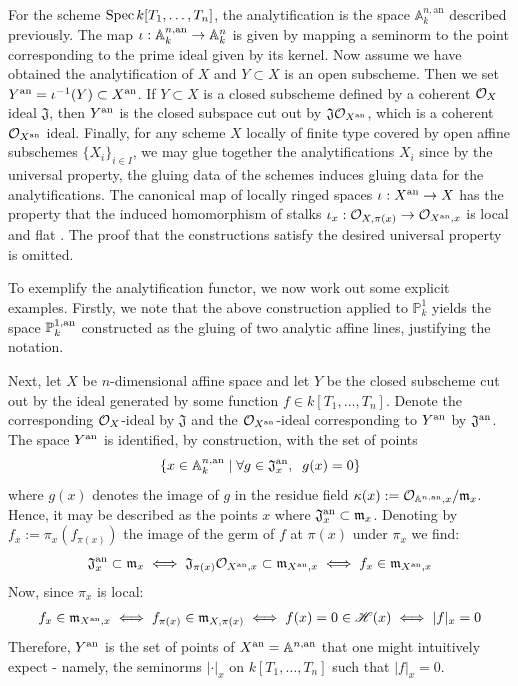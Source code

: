 For the scheme $\operatorname{Spec} k[T_1, \dots, T_n]$, the analytification is the space $\mathbb{A}^{n, \text{an}}_{k}$ described previously. The map $\iota: \mathbb{A}^{n, \text{an}}_{k} \to \mathbb{A}^{n}_{k}$ is given by mapping a seminorm to the point corresponding to the prime ideal given by its kernel.
Now assume we have obtained the analytification of $X$ and $Y \subset X$ is an open subscheme. Then we set $Y^{\text{an}} = \iota^{-1}(Y) \subset X^{\text{an}}$. 
If $Y \subset X$ is a closed subscheme defined by a coherent $\mathcal{O}_{X}$ ideal $\mathfrak{J}$, then $Y^{\text{an}}$ is the closed subspace cut out by $\mathfrak{J}\mathcal{O}_{X^{\text{an}}}$, which is a coherent $\mathcal{O}_{X^{\text{an}}}$ ideal. 
Finally, for any scheme $X$ locally of finite type covered by open affine subschemes $\{X_i\}_{i \in I}$, we may glue together the analytifications $X_i$ since by the universal property, the gluing data of the schemes induces gluing data for the analytifications. 
The canonical map of locally ringed spaces $\iota: X^{\text{an}} \to X$ has the property that the induced homomorphism of stalks $\iota_x: \mathcal{O}_{X, \pi(x)} \to \mathcal{O}_{X^{\text{an}}, x}$ is local and flat \parencite[Theorem 3.4.1]{berk1}. The proof that the constructions satisfy the desired universal property is omitted.

To exemplify the analytification functor, we now work out some explicit examples. Firstly, we note that the above construction applied to $\mathbb{P}^{1}_{k}$ yields the space $\mathbb{P}^{1, \text{an}}_{k}$ constructed as the gluing of two analytic affine lines, justifying the notation.

Next, let $X$ be $n$-dimensional affine space and let $Y$ be the closed subscheme cut out by the ideal generated by some function $f \in k[T_1, \dots, T_n]$. Denote the corresponding $\mathcal{O}_{X}$-ideal by $\mathfrak{J}$ and the $\mathcal{O}_{X^{\text{an}}}$-ideal corresponding to $Y^{\text{an}}$ by $\mathfrak{J}^{\text{an}}$. The space $Y^{\text{an}}$ is identified, by construction, with the set of points 
\[
\{ x \in \mathbb{A}^{n, \text{an}}_{k} \; \vert \; \forall g \in \mathfrak{J}_{x}^{\text{an}}, \; \; g(x) = 0 \}
\] 
where $g(x)$ denotes the image of $g$ in the residue field $\kappa(x) := \mathcal{O}_{\mathbb{A}^{n, \text{an}}, x}/\mathfrak{m}_{x}$. Hence, it may be described as the points $x$ where $\mathfrak{J}_{x}^{\text{an}} \subset \mathfrak{m}_{x}$. Denoting by $f_x := \pi_{x}(f_{\pi(x)})$ the image of the germ of $f$ at $\pi(x)$ under $\pi_x$ we find:
\[
\mathfrak{J}_x^{\text{an}} \subset \mathfrak{m}_x
\iff \mathfrak{J}_{\pi(x)} \mathcal{O}_{X^{\text{an}}, x} \subset \mathfrak{m}_{X^{\text{an}}, x} 
\iff f_x \in \mathfrak{m}_{X^{\text{an}}, x}  
\]
Now, since $\pi_x$ is local:
\begin{align*}
    f_x \in \mathfrak{m}_{X^{\text{an}}, x}
    \iff f_{\pi(x)} \in \mathfrak{m}_{X, \pi(x)}
    \iff f(x) = 0 \in \mathscr{H}(x) 
    \iff |f|_x = 0
\end{align*}
Therefore, $Y^{\text{an}}$ is the set of points of $X^{\text{an}} = \mathbb{A}^{n, \text{an}}$ that one might intuitively expect - namely, the seminorms $|\cdot|_x$ on $k[T_1, \dots, T_n]$ such that $|f|_x = 0$.

